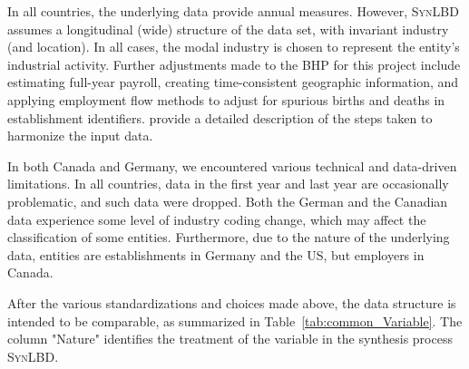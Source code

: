 \documentclass[10pt,twoside]{article}
\newcommand{\SynLBD}{\textsc{SynLBD}}
\begin{document}
In all countries, the underlying data provide annual measures. However, \SynLBD{} assumes a longitudinal (wide) structure of the data set, with invariant industry (and location). In all cases, the modal industry is chosen to represent the entity's industrial activity. 
Further adjustments made to the \ac{BHP} for this project include estimating full-year payroll, creating time-consistent geographic information, and applying employment flow methods \citep{RePEc:iab:iabfme:201006_en} to adjust for spurious births and deaths in establishment identifiers. \citet{SJIAOS-2014b} provide a detailed description of the steps taken to harmonize the input data. 


In both Canada and Germany, we encountered various technical and data-driven limitations. In all countries, data in the first year and last year are occasionally problematic, and such data  were dropped. 
Both the German and the Canadian data experience some level of industry coding change, which may affect the classification of some entities. Furthermore, due to the nature of the underlying data, entities are establishments in Germany and the US, but employers in Canada. 

After the various standardizations and choices made above, the data structure is intended to be comparable, as summarized in Table~\ref{tab:common_Variable}. The column "Nature" identifies the treatment of the variable in the synthesis process \SynLBD. 
\end{document}

